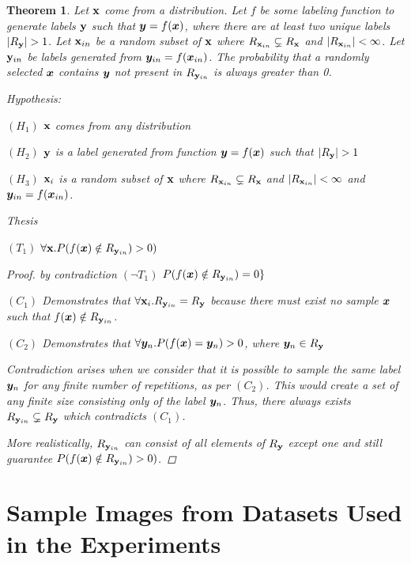 \documentclass{article} %
\theoremstyle{plain}
\newtheorem{theorem}{Theorem}[section]
\theoremstyle{definition}
\theoremstyle{remark}
\begin{document}
\begin{theorem}

Let ${\mathbf{x}}$ come from a distribution. Let $f$ be some labeling function to generate labels ${\mathbf{y}}$ such that ${\bm{y}} = f({\bm{x}})$, where there are at least two unique labels $|R_{\mathbf{y}}| > 1$. Let ${\mathbf{x}}_{in}$ be a random subset of ${\mathbf{x}}$ where $R_{{\mathbf{x}}_{in}} \subsetneq R_{\mathbf{x}}$ and $|R_{{\mathbf{x}}_{in}}| < \infty$. Let ${\mathbf{y}}_{in}$ be labels generated from ${\bm{y}}_{in} = f({\bm{x}}_{in})$. The probability that a randomly selected ${\bm{x}}$ contains ${\bm{y}}$ not present in $R_{{\mathbf{y}}_{in}}$ is always greater than 0. 

Hypothesis: 

$(H_1)$  ${\mathbf{x}}$ comes from any distribution 

$(H_2)$ ${\mathbf{y}}$ is a label generated from function ${\bm{y}} = f({\bm{x}})$ such that $|R_{\mathbf{y}}| > 1$

$(H_3)$ ${\mathbf{x}}_i$ is a random subset of ${\mathbf{x}}$ where $R_{{\mathbf{x}}_{in}} \subsetneq R_{\mathbf{x}}$ and $|R_{{\mathbf{x}}_{in}}| < \infty$  and ${\bm{y}}_{in} = f({\bm{x}}_{in})$.

Thesis 

$(T_1)$  $\forall {\mathbf{x}}. P( f({\bm{x}}) \notin R_{{\mathbf{y}}_{in}}) > 0)$ 

\begin{proof} by contradiction $(\neg T_1)$ $P( f({\bm{x}}) \notin R_{{\mathbf{y}}_{in}}) = 0\}$

$(C_1)$ Demonstrates that $\forall {\mathbf{x}}_i. R_{{\mathbf{y}}_{in}} = R_{{\mathbf{y}}}$ because there must exist no sample ${\bm{x}}$ such that $f({\bm{x}}) \notin R_{{\mathbf{y}}_{in}}$. 

$(C_2)$ Demonstrates that $\forall {\bm{y}}_n .P (f({\bm{x}}) = {\bm{y}}_n) > 0$, where ${\bm{y}}_n \in R_{\mathbf{y}}$ 

Contradiction arises when we consider that it is possible to sample the same label ${\bm{y}}_n$ for any finite number of repetitions, as per $(C_2)$. This would create a set of any finite size consisting only of the label ${\bm{y}}_n$. Thus, there always exists $R_{{\mathbf{y}}_{in}} \subsetneq R_{{\mathbf{y}}}$ which contradicts $(C_1)$.  

More realistically, $R_{{\mathbf{y}}_{in}}$ can consist of all elements of $R_{{\mathbf{y}}}$ except one and still guarantee $P( f({\bm{x}}) \notin R_{{\mathbf{y}}_{in}}) > 0)$.

\end{proof}
    
\end{theorem}

\section{Sample Images from Datasets Used in the Experiments}
\end{document}
